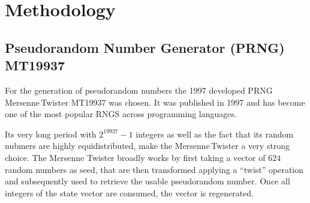 \section{Methodology}

\subsection{Pseudorandom Number Generator (PRNG) MT19937}\label{ssec:methodology_rng_mt19937}

For the generation of pseudorandom numbers the 1997 developed PRNG Mer\-sen\-ne\,Twis\-ter MT19937\cite{Makoto_Takuji} was chosen. 
It was published in 1997 and has become one of the most popular RNGS across programming languages.\cite{educativeMersenneTwister}

Its very long period with $2^{19937}-1$ integers as well as the fact that its random nubmers are highly equidistributed\cite{MT_LearnCPP}, make the Mer\-sen\-ne\,Twis\-ter a very strong choice.
The Mersenne Twister broadly works by first taking a vector of $624$ random numbers as seed, that are then transformed applying a ``twist'' operation and subsequently used to retrieve the usable pseudorandom number. 
Once all integers of the state vector are consumed, the vector is regenerated.\cite{educativeMersenneTwister}\cite{MT_DavidWong}

